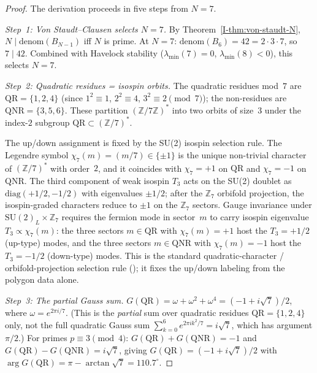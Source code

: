 \begin{proof}
The derivation proceeds in five steps from $N = 7$.

\emph{Step~1: Von Staudt--Clausen selects $N = 7$.}
By Theorem~\ref*{I-thm:von-staudt-N}, $N \mid \mathrm{denom}(B_{N-1})$
iff $N$ is prime.
At $N = 7$: $\mathrm{denom}(B_6) = 42 = 2 \cdot 3 \cdot 7$,
so $7 \mid 42$.
Combined with Havelock stability ($\lambda_{\min}(7) = 0$,
$\lambda_{\min}(8) < 0$), this selects $N = 7$.

\emph{Step~2: Quadratic residues = isospin orbits.}
The quadratic residues mod~$7$ are $\mathrm{QR} = \{1,2,4\}$
(since $1^2 \equiv 1$, $2^2 \equiv 4$, $3^2 \equiv 2 \pmod{7}$);
the non-residues are $\mathrm{QNR} = \{3,5,6\}$.
These partition $(\mathbb{Z}/7\mathbb{Z})^*$ into two orbits of size~$3$
under the index-$2$ subgroup $\mathrm{QR} \subset (\mathbb{Z}/7)^*$.

The up/down assignment is fixed by the SU(2) isospin selection
rule.  The Legendre symbol $\chi_7(m) = (m/7) \in \{\pm 1\}$
is the unique non-trivial character of $(\mathbb{Z}/7)^*$
with order~$2$, and it coincides with $\chi_7 = +1$ on
$\mathrm{QR}$ and $\chi_7 = -1$ on $\mathrm{QNR}$.
The third component of weak isospin $T_3$ acts on the SU(2)
doublet as $\mathrm{diag}(+1/2, -1/2)$ with eigenvalues
$\pm 1/2$; after the $\mathbb{Z}_7$ orbifold projection, the
isospin-graded characters reduce to $\pm 1$ on the
$\mathbb{Z}_7$ sectors.  Gauge invariance under
$\mathrm{SU}(2)_L \times \mathbb{Z}_7$ requires the fermion
mode in sector~$m$ to carry isospin eigenvalue
$T_3 \propto \chi_7(m)$: the three sectors $m \in \mathrm{QR}$
with $\chi_7(m) = +1$ host the $T_3 = +1/2$ (up-type) modes,
and the three sectors $m \in \mathrm{QNR}$ with $\chi_7(m) = -1$
host the $T_3 = -1/2$ (down-type) modes.  This is the
standard quadratic-character / orbifold-projection selection
rule (\citealt{DixonHarveyVafaWitten1985}); it fixes the
up/down labeling from the polygon data alone.

\emph{Step~3: The partial Gauss sum.}
$G(\mathrm{QR}) = \omega + \omega^2 + \omega^4 = (-1 + i\sqrt{7})/2$,
where $\omega = e^{2\pi i/7}$.
(This is the \emph{partial} sum over quadratic residues
$\mathrm{QR} = \{1,2,4\}$ only,
not the full quadratic Gauss sum
$\sum_{k=0}^{6} e^{2\pi i k^2/7} = i\sqrt{7}$,
which has argument $\pi/2$.)
For primes $p \equiv 3 \pmod{4}$:
$G(\mathrm{QR}) + G(\mathrm{QNR}) = -1$ and
$G(\mathrm{QR}) - G(\mathrm{QNR}) = i\sqrt{7}$,
giving $G(\mathrm{QR}) = (-1 + i\sqrt{7})/2$
with $\arg G(\mathrm{QR}) = \pi - \arctan\sqrt{7}
= 110.7^\circ$.


\end{proof}
